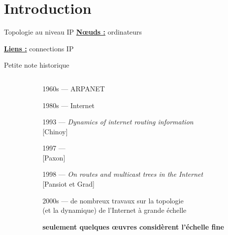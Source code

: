 
\section{Introduction}

\begin{frame}{Topologie au niveau IP}
  \underline{\bf Nœuds :} ordinateurs
    
  \underline{\bf Liens :} connections IP
\end{frame}

\begin{frame}[t]{Petite note historique}

  \begin{columns}[T] %
    \begin{column}[T]{0.1\textwidth}
      \vspace{-1em}
    \end{column}
    \begin{column}[T]{0.9\textwidth}
      \small
      {\color{black} 1960s --- ARPANET}
      \vspace{0.4em}
      
      {\color{black} 1980s --- Internet}
      \vspace{0.4em}

      1993 --- {\em Dynamics of internet routing information}\\
      \hfill [Chinoy]
      \vspace{0.4em}

      1997 --- \scalebox{0.85}{\em Measurements and Analysis of End-to-End Internet Dynamics}\\
      \hfill [Paxon]
      \vspace{0.4em}

      1998 --- {\em On routes and multicast trees in the Internet}\\
      \hfill [Pansiot et Grad]
      \vspace{0.4em}

      2000s --- de nombreux travaux sur la topologie  \\
      \hspace{4em} (et la dynamique) de l'Internet à grande échelle
      \vspace{0.3em}

      \hfill {\bf seulement quelques œuvres considèrent l'échelle fine}
    \end{column}
  \end{columns}
\end{frame}


